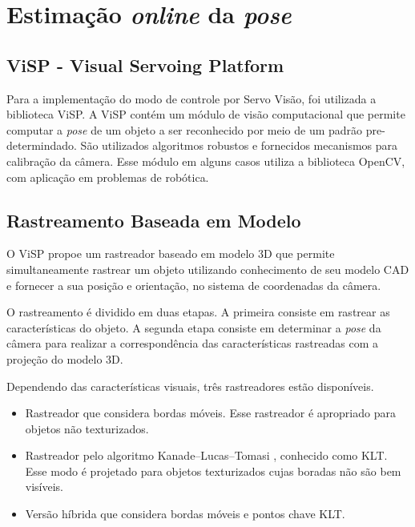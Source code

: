 \chapter{Estimação \textit{online} da \textit{pose}}  \label{chap:pose_est}
\section{ViSP - Visual Servoing Platform}

Para a implementação do modo de controle por Servo Visão, foi utilizada a biblioteca ViSP. A ViSP contém um módulo de visão computacional que permite computar a \textit{pose} de um objeto a ser reconhecido por meio de um padrão pre-determindado. São utilizados algoritmos robustos e fornecidos mecanismos para calibração da câmera. Esse módulo em alguns casos utiliza a biblioteca OpenCV, com aplicação em problemas de robótica. 
\section{Rastreamento Baseada em Modelo}
O ViSP propoe um rastreador baseado em modelo 3D que permite simultaneamente rastrear um objeto utilizando conhecimento de seu modelo CAD e fornecer a sua posição e  orientação, no sistema de coordenadas da câmera.

O rastreamento é dividido em duas etapas. A primeira consiste em rastrear as características do objeto. A segunda etapa consiste em determinar a \textit{pose} da câmera para realizar a correspondência das características rastreadas com a projeção do modelo 3D.

Dependendo das características visuais, três rastreadores estão disponíveis.
\begin{itemize}
\item Rastreador que considera bordas móveis. Esse rastreador é apropriado para objetos não texturizados.
\item Rastreador pelo algoritmo Kanade–Lucas–Tomasi \citep{tomasi1991detection}, conhecido como KLT. Esse modo é projetado para objetos texturizados cujas boradas não são bem visíveis.
\item Versão híbrida que considera bordas móveis e pontos chave KLT. 
\end{itemize}

